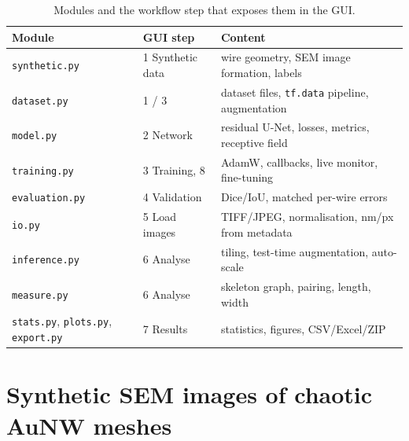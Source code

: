 \documentclass[11pt,a4paper]{article}
\newcommand{\code}[1]{\texttt{#1}}
\begin{document}
\begin{table}[H]\centering\small
\caption{Modules and the workflow step that exposes them in the GUI.}\label{tab:modules}
\begin{tabular}{@{}llp{7.4cm}@{}}\toprule
Module & GUI step & Content \\\midrule
\code{synthetic.py} & 1 Synthetic data & wire geometry, SEM image formation, labels\\
\code{dataset.py} & 1 / 3 & dataset files, \code{tf.data} pipeline, augmentation\\
\code{model.py} & 2 Network & residual U-Net, losses, metrics, receptive field\\
\code{training.py} & 3 Training, 8 & AdamW, callbacks, live monitor, fine-tuning\\
\code{evaluation.py} & 4 Validation & Dice/IoU, matched per-wire errors\\
\code{io.py} & 5 Load images & TIFF/JPEG, normalisation, nm/px from metadata\\
\code{inference.py} & 6 Analyse & tiling, test-time augmentation, auto-scale\\
\code{measure.py} & 6 Analyse & skeleton graph, pairing, length, width\\
\code{stats.py}, \code{plots.py}, \code{export.py} & 7 Results & statistics, figures, CSV/Excel/ZIP\\\bottomrule
\end{tabular}
\end{table}

\section{Synthetic SEM images of chaotic AuNW meshes}\label{sec:synthetic}
\end{document}
